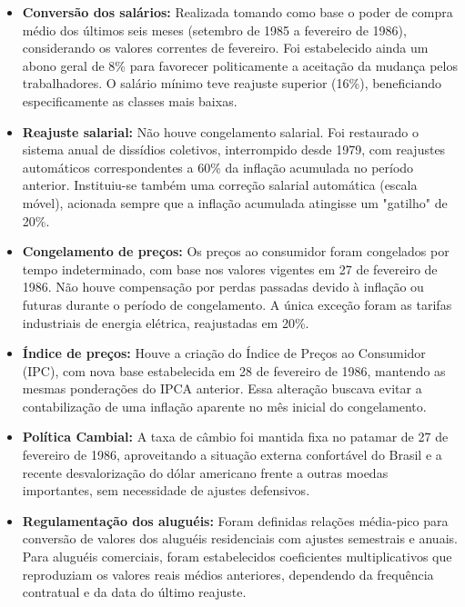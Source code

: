 \documentclass[a4paper,12pt]{article}[abntex2]
\begin{document}
\begin{itemize}
    \item \textbf{Conversão dos salários:} Realizada tomando como base o poder de compra médio dos últimos seis meses (setembro de 1985 a fevereiro de 1986), considerando os valores correntes de fevereiro. Foi estabelecido ainda um abono geral de 8\% para favorecer politicamente a aceitação da mudança pelos trabalhadores. O salário mínimo teve reajuste superior (16\%), beneficiando especificamente as classes mais baixas.

    \item \textbf{Reajuste salarial:} Não houve congelamento salarial. Foi restaurado o sistema anual de dissídios coletivos, interrompido desde 1979, com reajustes automáticos correspondentes a 60\% da inflação acumulada no período anterior. Instituiu-se também uma correção salarial automática (escala móvel), acionada sempre que a inflação acumulada atingisse um "gatilho" de 20\%.

    \item \textbf{Congelamento de preços:} Os preços ao consumidor foram congelados por tempo indeterminado, com base nos valores vigentes em 27 de fevereiro de 1986. Não houve compensação por perdas passadas devido à inflação ou futuras durante o período de congelamento. A única exceção foram as tarifas industriais de energia elétrica, reajustadas em 20\%.

    \item \textbf{Índice de preços:} Houve a criação do Índice de Preços ao Consumidor (IPC), com nova base estabelecida em 28 de fevereiro de 1986, mantendo as mesmas ponderações do IPCA anterior. Essa alteração buscava evitar a contabilização de uma inflação aparente no mês inicial do congelamento.

    \item \textbf{Política Cambial:} A taxa de câmbio foi mantida fixa no patamar de 27 de fevereiro de 1986, aproveitando a situação externa confortável do Brasil e a recente desvalorização do dólar americano frente a outras moedas importantes, sem necessidade de ajustes defensivos.

    \item \textbf{Regulamentação dos aluguéis:} Foram definidas relações média-pico para conversão de valores dos aluguéis residenciais com ajustes semestrais e anuais. Para aluguéis comerciais, foram estabelecidos coeficientes multiplicativos que reproduziam os valores reais médios anteriores, dependendo da frequência contratual e da data do último reajuste.


\end{itemize}
\end{document}
